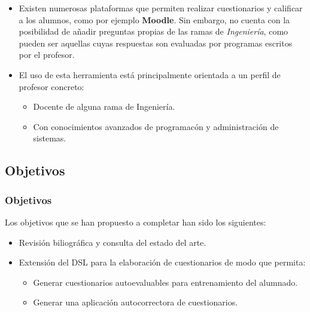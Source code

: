 \documentclass{beamer}
\begin{document}
\begin{frame}[allowframebreaks]
  \begin{itemize}
    \item Existen numerosas plataformas que permiten realizar cuestionarios y calificar a los alumnos, como por ejemplo {\bfseries Moodle}.
    Sin embargo, no cuenta con la posibilidad de añadir preguntas propias de las ramas de \textit{Ingeniería}, como pueden ser aquellas
    cuyas respuestas son evaluadas por programas escritos por el profesor.
    \item El uso de esta herramienta está principalmente orientada a un perfil de profesor concreto:
    \begin{itemize}
      \item Docente de alguna rama de Ingeniería.
      \item Con conocimientos avanzados de programacón y administración de sistemas.
    \end{itemize}
  \end{itemize}
  
\end{frame}

\subsection{Objetivos}
\begin{frame}
  \frametitle{Objetivos}
  
  Los objetivos que se han propuesto a completar han sido los siguientes:
  \begin{itemize}
    \item Revisión biliográfica y consulta del estado del arte.
    \item Extensión del DSL para la elaboración de cuestionarios de modo que permita:
    \begin{itemize}
      \item Generar cuestionarios autoevaluables para entrenamiento del alumnado.
      \item Generar una aplicación autocorrectora de cuestionarios.
    \end{itemize}
  \end{itemize}
\end{frame}

\end{document}
